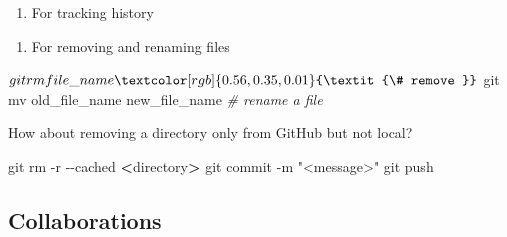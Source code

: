 \documentclass[
]{book}
\newenvironment{Shaded}{\begin{snugshade}}{\end{snugshade}}
\newcommand{\AttributeTok}[1]{\textcolor[rgb]{0.77,0.63,0.00}{#1}}
\newcommand{\CommentTok}[1]{\textcolor[rgb]{0.56,0.35,0.01}{\textit{#1}}}
\newcommand{\ExtensionTok}[1]{#1}
\newcommand{\FunctionTok}[1]{\textcolor[rgb]{0.00,0.00,0.00}{#1}}
\newcommand{\NormalTok}[1]{#1}
\newcommand{\OperatorTok}[1]{\textcolor[rgb]{0.81,0.36,0.00}{\textbf{#1}}}
\newcommand{\StringTok}[1]{\textcolor[rgb]{0.31,0.60,0.02}{#1}}
\providecommand{\tightlist}{%
  \setlength{\itemsep}{0pt}\setlength{\parskip}{0pt}}
\begin{document}
\begin{enumerate}
\def\labelenumi{\arabic{enumi}.}
\tightlist
\item
  For tracking history
\end{enumerate}

\begin{Shaded}
\end{Shaded}

\begin{enumerate}
\def\labelenumi{\arabic{enumi}.}
\setcounter{enumi}{1}
\tightlist
\item
  For removing and renaming files
\end{enumerate}

\begin{Shaded}
\begin{Highlighting}[]
\ExtensionTok{$}\NormalTok{ git rm file\_name }\CommentTok{\# remove }
\ExtensionTok{$}\NormalTok{ git mv old\_file\_name new\_file\_name }\CommentTok{\# rename a file }
\end{Highlighting}
\end{Shaded}

How about removing a directory only from GitHub but not local?

\begin{Shaded}
\begin{Highlighting}[]
\FunctionTok{git}\NormalTok{ rm }\AttributeTok{{-}r} \AttributeTok{{-}{-}cached} \OperatorTok{\textless{}}\NormalTok{directory}\OperatorTok{\textgreater{}}
\FunctionTok{git}\NormalTok{ commit }\AttributeTok{{-}m} \StringTok{"\textless{}message\textgreater{}"}
\FunctionTok{git}\NormalTok{ push}
\end{Highlighting}
\end{Shaded}

\hypertarget{collaborations}{%
\subsection{Collaborations}\label{collaborations}}
\end{document}
